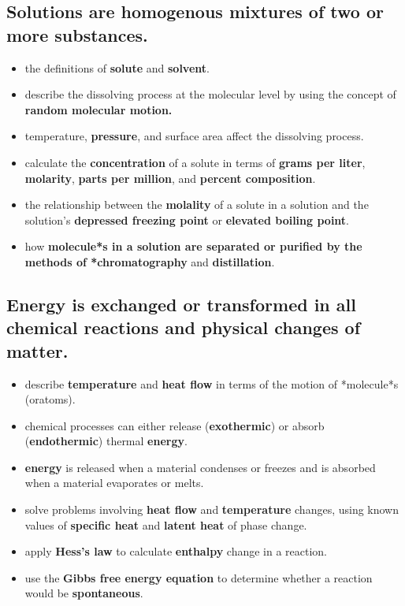 \documentclass[11pt]{article}
\begin{document}
\subsection{Solutions are homogenous mixtures of two or more substances.}
\label{sec:org56714c7}

\begin{itemize}
\item the definitions of \textbf{solute} and \textbf{solvent}.
\item describe the dissolving process at the molecular level by using the concept of \textbf{random molecular motion.}
\item temperature, \textbf{pressure}, and surface area affect the dissolving process.
\item calculate the \textbf{\textbf{concentration}} of a solute in terms of \textbf{grams per liter}, \textbf{molarity}, \textbf{parts per million}, and \textbf{percent composition}.
\item the relationship between the \textbf{molality} of a solute in a solution and the solution’s \textbf{depressed freezing point} or \textbf{elevated boiling point}.
\item how \textbf{molecule*s in a solution are separated or purified by the methods of *chromatography} and \textbf{distillation}.
\end{itemize}
\subsection{\textbf{Energy} is exchanged or transformed in all chemical reactions and physical changes of matter.}
\label{sec:org7903a28}

\begin{itemize}
\item describe \textbf{temperature} and \textbf{heat flow} in terms of the motion of *molecule*s (oratoms).
\item chemical processes can either release (\textbf{exothermic}) or absorb (\textbf{endothermic}) thermal \textbf{energy}.
\item \textbf{energy} is released when a material condenses or freezes and is absorbed when a material evaporates or melts.
\item solve problems involving \textbf{heat flow} and \textbf{temperature} changes, using known values of \textbf{specific heat} and \textbf{latent heat} of phase change.
\item apply \textbf{Hess’s law} to calculate \textbf{enthalpy} change in a reaction.
\item use the \textbf{Gibbs free energy equation} to determine whether a reaction would be \textbf{spontaneous}.
\end{itemize}
\end{document}
